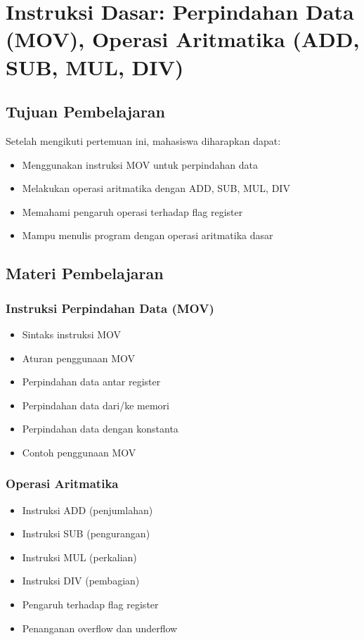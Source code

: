 \chapter{Instruksi Dasar: Perpindahan Data (MOV), Operasi Aritmatika (ADD, SUB, MUL, DIV)}

\section{Tujuan Pembelajaran}
Setelah mengikuti pertemuan ini, mahasiswa diharapkan dapat:
\begin{itemize}
\item Menggunakan instruksi MOV untuk perpindahan data
\item Melakukan operasi aritmatika dengan ADD, SUB, MUL, DIV
\item Memahami pengaruh operasi terhadap flag register
\item Mampu menulis program dengan operasi aritmatika dasar
\end{itemize}

\section{Materi Pembelajaran}

\subsection{Instruksi Perpindahan Data (MOV)}
\begin{itemize}
\item Sintaks instruksi MOV
\item Aturan penggunaan MOV
\item Perpindahan data antar register
\item Perpindahan data dari/ke memori
\item Perpindahan data dengan konstanta
\item Contoh penggunaan MOV
\end{itemize}

\subsection{Operasi Aritmatika}
\begin{itemize}
\item Instruksi ADD (penjumlahan)
\item Instruksi SUB (pengurangan)
\item Instruksi MUL (perkalian)
\item Instruksi DIV (pembagian)
\item Pengaruh terhadap flag register
\item Penanganan overflow dan underflow
\end{itemize}

